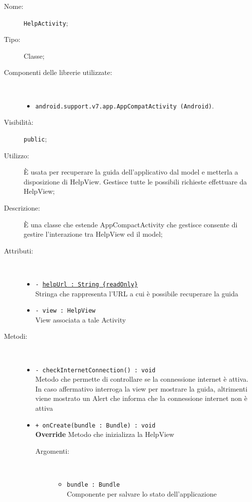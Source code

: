 \documentclass[../DefinizioneDiProdotto.tex]{subfiles}
\begin{document}
\begin{description}
	\item[Nome:] \texttt{HelpActivity};
	\item[Tipo:] Classe;
	\item[Componenti delle librerie utilizzate:] \
	\begin{itemize}
		\item \texttt{android.support.v7.app.AppCompatActivity (Android)}.
		
	\end{itemize}
	\item[Visibilità:] \texttt{public};
	\item[Utilizzo:] È usata per recuperare la guida dell'applicativo dal model e metterla a disposizione di HelpView. Gestisce tutte le possibili richieste effettuare da HelpView;
	\item[Descrizione:] È una classe che estende AppCompactActivity che gestisce consente di gestire l'interazione tra HelpView ed il model;
	\item[Attributi:] \
	\begin{itemize}
		\item \texttt{- \underline{helpUrl : String \{readOnly\}}}\\
		Stringa che rappresenta l'URL a cui è possibile recuperare la guida
		
		\item \texttt{- view : HelpView}\\
		View associata a tale Activity
		
	\end{itemize}
	\item[Metodi:] \
	\begin{itemize}
		\item \texttt{- checkInternetConnection() : void}\\
		Metodo che permette di controllare se la connessione internet è attiva. In caso affermativo interroga la view per mostrare la guida, altrimenti viene mostrato un Alert che informa che la connessione internet non è attiva
		\item \texttt{+ onCreate(bundle : Bundle) : void}\\
		\textbf{Override} Metodo che inizializza la HelpView
		\begin{description}
			\item[Argomenti:] \
			\begin{itemize}
				\item \texttt{bundle : Bundle}\\
				Componente per salvare lo stato dell'applicazione\end{itemize}
		\end{description}
	\end{itemize}
\end{description}
\end{document}
